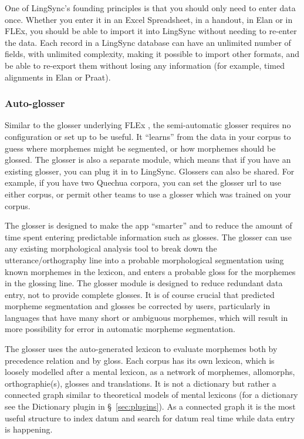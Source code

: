 \documentclass[letterpaper, 12pt, dvips]{mitwpl}
\begin{document}
One of LingSync's founding principles is that you should only need to enter data once.
Whether you enter it in an Excel Spreadsheet,
in a handout,
in Elan or in FLEx,
you should be able to import it into LingSync without needing to re-enter the data.
 Each record in a LingSync database can have an unlimited number of fields,
with unlimited complexity,
making it possible to import other formats,
and be able to re-export them without losing any information (for example,
timed alignments in Elan or Praat).



\subsubsection{Auto-glosser}

 

Similar to the glosser underlying FLEx \citep{Black:2006}, the semi-automatic glosser requires no configuration or set up to be useful.
It ``learns'' from the data in your corpus to guess where morphemes might be segmented,
or how morphemes should be glossed.
The glosser is also a separate module,
which means that if you have an existing glosser, you can plug it in to LingSync.
Glossers can also be shared.
For example,
if you have two Quechua corpora,
you can set the glosser url to use either corpus, or permit other teams to use a glosser which was trained on your corpus.
 

The glosser is designed to make the app ``smarter'' and to reduce the amount of time spent entering predictable information such as glosses.
The glosser can use any existing morphological analysis tool to break down the utterance/orthography line  into a probable morphological segmentation using known morphemes in the lexicon,
and enters a probable gloss for the morphemes in the glossing line.
The glosser module is designed to reduce redundant data entry,
not to provide complete glosses.
It is of course crucial that predicted morpheme segmentation and glosses be corrected by users,
particularly in languages that have many short or ambiguous morphemes,
which will result in more possibility for error in automatic morpheme segmentation.
 

The glosser uses the auto-generated lexicon to evaluate morphemes both by precedence relation and by gloss.
Each corpus has its own lexicon,
which is loosely modelled after a mental lexicon,
as a network of morphemes,
allomorphs,
orthographie(s),
glosses and translations.
 It is not a dictionary but rather a connected graph similar to theoretical models of mental lexicons (for a dictionary see the Dictionary plugin in \S~\ref{sec:plugins}).
As a connected graph it is the most useful structure to index datum and search for datum real time while data entry is happening.
\end{document}
